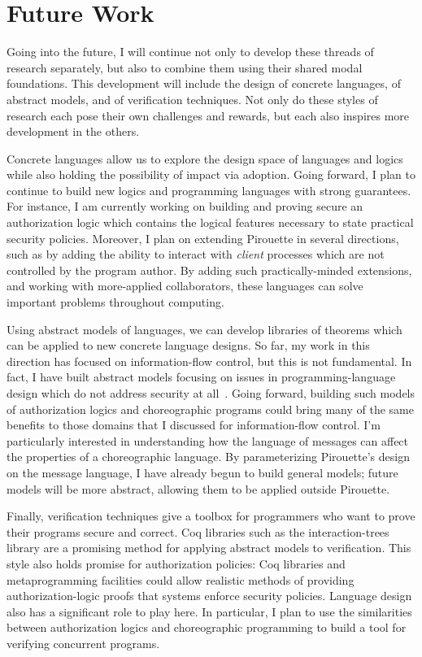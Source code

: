 \documentclass{article}
\theoremstyle{definition}
\begin{document}
\section*{Future Work}

Going into the future, I will continue not only to develop these threads of research separately, but also to combine them using their shared modal foundations.
This development will include the design of concrete languages, of abstract models, and of verification techniques.
Not only do these styles of research each pose their own challenges and rewards, but each also inspires more development in the others.

Concrete languages allow us to explore the design space of languages and logics while also holding the possibility of impact via adoption.
Going forward, I plan to continue to build new logics and programming languages with strong guarantees.
For instance, I am currently working on building and proving secure an authorization logic which contains the logical features necessary to state practical security policies.
Moreover, I plan on extending Pirouette in several directions, such as by adding the ability to interact with \emph{client} processes which are not controlled by the program author.
By adding such practically-minded extensions, and working with more-applied collaborators, these languages can solve important problems throughout computing.

Using abstract models of languages, we can develop libraries of theorems which can be applied to new concrete language designs.
So far, my work in this direction has focused on information-flow control, but this is not fundamental.
In fact, I have built abstract models focusing on issues in programming-language design which do not address security at all~\citep{HirschT18}.
Going forward, building such models of authorization logics and choreographic programs could bring many of the same benefits to those domains that I discussed for information-flow control.
I'm particularly interested in understanding how the language of messages can affect the properties of a choreographic language.
By parameterizing Pirouette's design on the message language, I have already begun to build general models; future models will be more abstract, allowing them to be applied outside Pirouette.

Finally, verification techniques give a toolbox for programmers who want to prove their programs secure and correct.
Coq libraries such as the interaction-trees library are a promising method for applying abstract models to verification.
This style also holds promise for authorization policies: Coq libraries and metaprogramming facilities could allow realistic methods of providing authorization-logic proofs that systems enforce security policies.
Language design also has a significant role to play here.
In particular, I plan to use the similarities between authorization logics and choreographic programming to build a tool for verifying concurrent programs.


\end{document}
